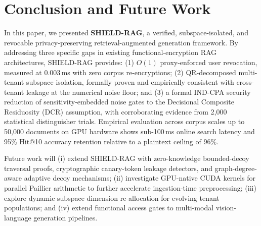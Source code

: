 \documentclass[10pt,a4paper]{article}
\begin{document}
\section{Conclusion and Future Work}
\label{sec:conclusion}
In this paper, we presented \textbf{SHIELD-RAG}, a verified, subspace-isolated, and revocable privacy-preserving retrieval-augmented generation framework. By addressing three specific gaps in existing functional-encryption RAG architectures, SHIELD-RAG provides: (1) $O(1)$ proxy-enforced user revocation, measured at $0.003$\,ms with zero corpus re-encryptions; (2) QR-decomposed multi-tenant subspace isolation, formally proven and empirically consistent with cross-tenant leakage at the numerical noise floor; and (3) a formal IND-CPA security reduction of sensitivity-embedded noise gates to the Decisional Composite Residuosity (DCR) assumption, with corroborating evidence from 2,000 statistical distinguisher trials. Empirical evaluation across corpus scales up to 50,000 documents on GPU hardware shows sub-100\,ms online search latency and 95\% Hit@10 accuracy retention relative to a plaintext ceiling of 96\%.

Future work will (i) extend SHIELD-RAG with zero-knowledge bounded-decoy traversal proofs, cryptographic canary-token leakage detectors, and graph-degree-aware adaptive decoy mechanisms; (ii) investigate GPU-native CUDA kernels for parallel Paillier arithmetic to further accelerate ingestion-time preprocessing; (iii) explore dynamic subspace dimension re-allocation for evolving tenant populations; and (iv) extend functional access gates to multi-modal vision-language generation pipelines.
\end{document}
